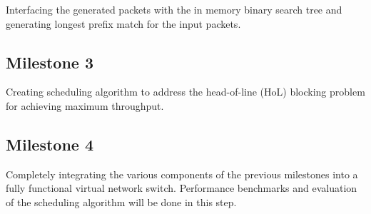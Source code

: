 \documentclass{article}
\begin{document}
        Interfacing the generated packets with the in memory binary search tree
        and generating longest prefix match for the input packets. 
        
    \subsection{Milestone 3}
        
        Creating scheduling algorithm to address the head-of-line (HoL) blocking problem for achieving maximum throughput.
            
    \subsection{Milestone 4}
    
        Completely integrating the various components of the previous milestones into a fully functional virtual network switch. Performance benchmarks and evaluation of the scheduling algorithm will be done in this step. 
    
\end{document}
